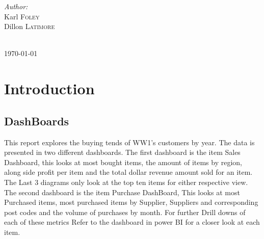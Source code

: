\documentclass[12pt]{article}
\begin{document}
\begin{titlepage}
\begin{minipage}{1.0\textwidth}
\begin{flushleft} \large
\emph{Author:}\\

Karl \textsc{Foley}\\ %
Dillon \textsc{Latimore}\\ %
\end{flushleft}

\end{minipage}\\[2cm]



{\large \today}\\[2cm] %

\vfill %

\end{titlepage}


\setcounter{page}{1}
\tableofcontents
\newpage
\listoffigures
\newpage

\setcounter{page}{1}

\section{Introduction}

\subsection{DashBoards}
\begin{flushleft}
This report explores the buying tends of WW1's customers by year. The data is presented in two different dashboards. The first dashboard is the item Sales Dashboard, this looks at most bought items, the amount of items by region, along side profit per item and the total dollar revenue amount sold for an item. The Last 3 diagrams only look at the top ten items for either respective view.
\vfill
The second dashboard is the item Purchase DashBoard, This looks at most Purchased items, most purchased items by Supplier, Suppliers and corresponding post codes and the volume of purchases by month.
\vfill
For further Drill downs of each of these metrics Refer to the dashboard in power BI for a closer look at each item.
\end{flushleft}
\end{document}
